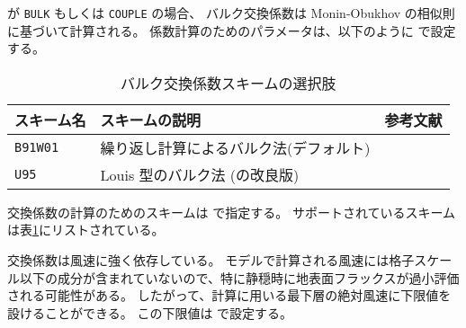  が \verb|BULK| もしくは \verb|COUPLE| の場合、
バルク交換係数は Monin-Obukhov の相似則に基づいて計算される。
係数計算のためのパラメータは、以下のように  で設定する。
%

\begin{table}[h]
\begin{center}
  \caption{バルク交換係数スキームの選択肢}
  \label{tab:nml_bulk}
  \begin{tabularx}{150mm}{llX} \hline
    \rowcolor[gray]{0.9}  スキーム名 & スキームの説明 & 参考文献 \\ \hline
      \verb|B91W01| & 繰り返し計算によるバルク法(デフォルト) & \citet{beljaars_1991,wilson_2001,nishizawa_2018} \\
      \verb|U95|    & Louis 型のバルク法 (\citet{louis_1979}の改良版) & \citet{uno_1995} \\
    \hline
  \end{tabularx}
\end{center}
\end{table}

交換係数の計算のためのスキームは  で指定する。
サポートされているスキームは表\ref{tab:nml_bulk}にリストされている。

交換係数は風速に強く依存している。
モデルで計算される風速には格子スケール以下の成分が含まれていないので、特に静穏時に地表面フラックスが過小評価される可能性がある。
したがって、計算に用いる最下層の絶対風速に下限値を設けることができる。
この下限値は  で設定する。

